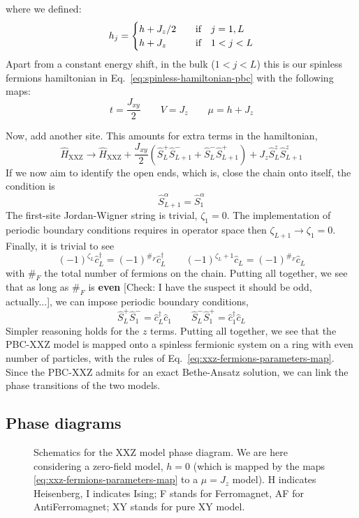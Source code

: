 where we defined:
\[
	h_j = \begin{cases}
		h + J_z/2 &\qq{if} j=1,L \\
		h + J_z &\qq{if} 1<j<L
	\end{cases}
\]
Apart from a constant energy shift, in the bulk ($1<j<L$) this is our spinless fermions hamiltonian in Eq.~\eqref{eq:spinless-hamiltonian-pbc} with the following maps:
\begin{equation}\label{eq:xxz-fermions-parameters-map}
	t = \frac{J_{xy}}{2}
	\qquad
	V = J_z
	\qquad
	\mu = h + J_z
\end{equation}

Now, add another site. This amounts for extra terms in the hamiltonian,
\[
	\hat H_\mathrm{XXZ} \to \hat H_\mathrm{XXZ} + \frac{J_{xy}}{2} \left( 
		\hat S_L^+ \hat S_{L+1}^- + \hat S_L^- \hat S_{L+1}^+
	\right) + J_z \hat S_L^z \hat S_{L+1}^z
\]
If we now aim to identify the open ends, which is, close the chain onto itself, the condition is
\[
	\hat S_{L+1}^\alpha = \hat S_1^\alpha
\]
The first-site Jordan-Wigner string is trivial, $\zeta_1 = 0$. The implementation of periodic boundary conditions requires in operator space then $\zeta_{L+1} \to \zeta_1 = 0$. Finally, it is trivial to see
\[
	(-1)^{\zeta_L} \hat c_L^\dagger = (-1)^{\#_F} \hat c_L^\dagger
	\qquad
	(-1)^{\zeta_L+1} \hat c_L = (-1)^{\#_F} \hat c_L
\]
with $\#_F$ the total number of fermions on the chain. Putting all together, we see that as long as $\#_F$ is \textbf{even} {\color{tabred}[Check: I have the suspect it should be odd, actually...]}, we can impose periodic boundary conditions,
\[
	\hat S_L^+ \hat S_1^- = \hat c_L^\dagger \hat c_1
	\qquad
	\hat S_L^- \hat S_1^+ = \hat c_1^\dagger \hat c_L
\]
Simpler reasoning holds for the $z$ terms. Putting all together, we see that the PBC-$\mathrm{XXZ}$ model is mapped onto a spinless fermionic system on a ring with even number of particles, with the rules of Eq.~\eqref{eq:xxz-fermions-parameters-map}. Since the PBC-$\mathrm{XXZ}$ admits for an exact Bethe-Ansatz solution, we can link the phase transitions of the two models.

\subsection*{Phase diagrams}

\begin{figure}
	\centering
	
	\caption{Schematics for the $\mathrm{XXZ}$ model phase diagram. We are here considering a zero-field model, $h=0$ (which is mapped by the maps \eqref{eq:xxz-fermions-parameters-map} to a $\mu = J_z$ model). H indicates Heisenberg, I indicates Ising; F stands for Ferromagnet, AF for AntiFerromagnet; XY stands for pure $\mathrm{XY}$ model.}
	\label{xxz-phase-diagram}
\end{figure}

